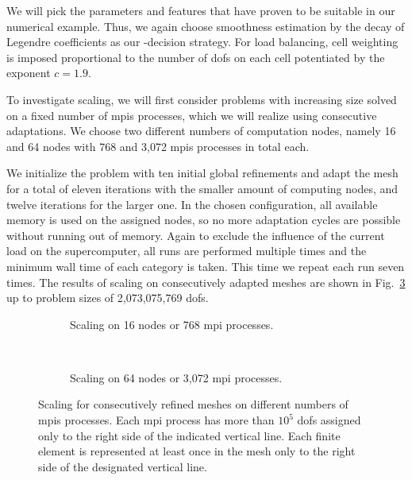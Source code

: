 We will pick the parameters and features that have proven to be suitable in our numerical example. Thus, we again choose smoothness estimation by the decay of Legendre coefficients as our \hp-decision strategy. For load balancing, cell weighting is imposed proportional to the number of \glspl{dof} on each cell potentiated by the exponent $c = 1.9$.



To investigate scaling, we will first consider problems with increasing size solved on a fixed number of \glspl{mpi} processes, which we will realize using consecutive adaptations. We choose two different numbers of computation nodes, namely 16 and 64 nodes with 768 and 3,072 \glspl{mpi} processes in total each.

We initialize the problem with ten initial global refinements and adapt the mesh for a total of eleven iterations with the smaller amount of computing nodes, and twelve iterations for the larger one. In the chosen configuration, all available memory is used on the assigned nodes, so no more adaptation cycles are possible without running out of memory. Again to exclude the influence of the current load on the supercomputer, all runs are performed multiple times and the minimum wall time of each category is taken. This time we repeat each run seven times. The results of scaling on consecutively adapted meshes are shown in Fig.~\ref{fig:weak} up to problem sizes of 2,073,075,769 \glspl{dof}.

\begin{figure}
\begin{subfigure}{1\textwidth}
  \centering
  
  \caption{Scaling on 16 nodes or 768 \gls{mpi} processes.}
  \label{fig:weak-nodes16}
\end{subfigure} \\
\vspace{1em}
\begin{subfigure}{1\textwidth}
  \centering
  
  \caption{Scaling on 64 nodes or 3,072 \gls{mpi} processes.}
  \label{fig:weak-nodes64}
\end{subfigure}
\vspace{-1em}
\caption[Scaling for consecutively refined meshes on different numbers of  processes.]{Scaling for consecutively refined meshes on different numbers of \glspl{mpi} processes. Each \gls{mpi} process has more than $10^5$ \glspl{dof} assigned only to the right side of the indicated vertical line. Each finite element is represented at least once in the mesh only to the right side of the designated vertical line.}
\label{fig:weak}
\end{figure}

